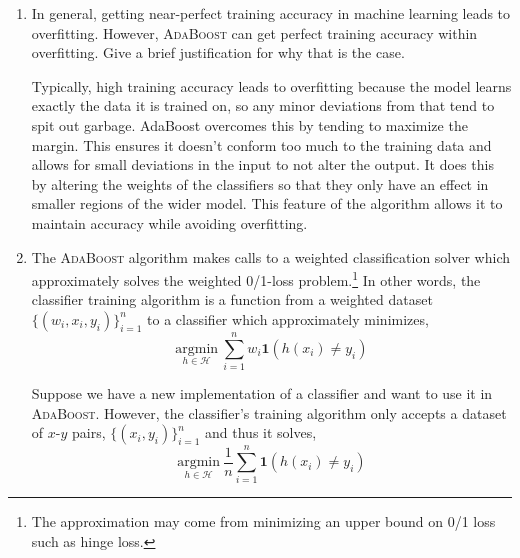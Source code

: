 \documentclass[11pt]{article}
\newcounter{QuestionCounter}
\newcounter{SubQuestionCounter}[QuestionCounter]
\newcommand{\newsubquestion}{\stepcounter{SubQuestionCounter}}
\begin{document}
\begin{enumerate}[(1)]
\begin{answertext}{3cm}{}

The ensemble error rate is defined as the fraction of data points that are classified incorrectly. It is bounded by $\prod_{t=1}^{T}2\sqrt{\epsilon_t(1-\epsilon_t)}$. We can assume that the classifier does better than random (especially after an iteration of AdaBoost). Basing off of the first value of $\epsilon_1 = .33$, we can approximate an upper bound the error rate to be $(2\sqrt{.33 \cdot .77})^{10} = .541$.

\end{answertext} 

\newsubquestion
\item In general, getting near-perfect training accuracy in machine learning
  leads to overfitting.  However, \textsc{AdaBoost} can get perfect training accuracy
  within overfitting.  Give a brief justification for why that is the case.
  
\begin{answertext}{5cm}{}

Typically, high training accuracy leads to overfitting because the model learns exactly the data it is trained on, so any minor deviations from that tend to spit out garbage. AdaBoost overcomes this by tending to maximize the margin. This ensures it doesn't conform too much to the training data and allows for small deviations in the input to not alter the output. It does this by altering the weights of the classifiers so that they only have an effect in smaller regions of the wider model. This feature of the algorithm allows it to maintain accuracy while avoiding overfitting.

\end{answertext} 
\pagebreak

\item The \textsc{AdaBoost} algorithm makes calls to a weighted classification
  solver which approximately solves the weighted 0/1-loss problem.\footnote{The
    approximation may come from minimizing an upper bound on 0/1 loss such as
    hinge loss.}  In other words, the classifier training algorithm is a
  function from a weighted dataset $\{ (w_i, x_i, y_i) \}_{i=1}^n$ to a
  classifier which approximately minimizes,
%
\begin{equation}\label{eq:weighted}
  \underset{h \in \mathcal{H}}{\mathrm{argmin}}\ \sum_{i=1}^n w_i \boldsymbol{1}(h(x_i) \ne y_i)
\end{equation}

  Suppose we have a new implementation of a classifier and want to use it in
  \textsc{AdaBoost}.  However, the classifier's training algorithm only accepts
  a dataset of $x$-$y$ pairs, $\{ (x_i, y_i) \}_{i=1}^n$ and thus it solves,
%
\begin{equation}\label{eq:unweighted}
  \underset{h \in \mathcal{H}}{\mathrm{argmin}}\ \frac{1}{n} \sum_{i=1}^n \boldsymbol{1}(h(x_i) \ne y_i)
\end{equation}


\end{enumerate}
\end{document}
